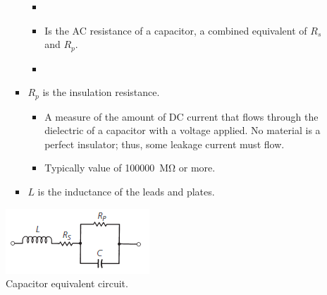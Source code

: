 \begin{itemize}
\begin{itemize}
\begin{itemize}
\begin{itemize}
				\item[]
				\item Is the AC resistance of a capacitor, a combined equivalent of $R_s$ and $R_p$.  
				\item[]
			\end{itemize}
			\item $R_p$ is the insulation resistance.
			\begin{itemize}
				\item A measure of the amount of DC	current that flows through the dielectric of a capacitor with a voltage applied. No material is a perfect insulator; thus, some	leakage current must flow.
				\item Typically value of \SI{100000}{\mega\ohm} or more.
			\end{itemize}
			\item $L$ is the inductance of the leads and plates.
		\end{itemize}
	\end{itemize}
\end{itemize}

\begin{figure} [H]
	\centering
	\includegraphics[width=0.4\linewidth]{graphics/17.png}
	\caption{Capacitor equivalent circuit.}
	\label{fig:17}
\end{figure}

